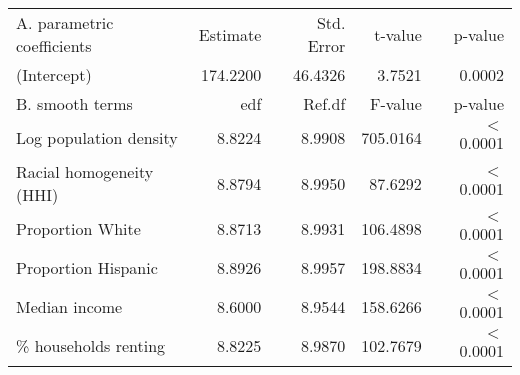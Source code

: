 \begin{table}[ht]
\centering
\begin{tabular}{lrrrr}
   \hline
A. parametric coefficients & Estimate & Std. Error & t-value & p-value \\ 
  (Intercept) & 174.2200 & 46.4326 & 3.7521 & 0.0002 \\ 
   \hline
B. smooth terms & edf & Ref.df & F-value & p-value \\ 
  Log population density & 8.8224 & 8.9908 & 705.0164 & $<$ 0.0001 \\ 
  Racial homogeneity (HHI) & 8.8794 & 8.9950 & 87.6292 & $<$ 0.0001 \\ 
  Proportion White & 8.8713 & 8.9931 & 106.4898 & $<$ 0.0001 \\ 
  Proportion Hispanic & 8.8926 & 8.9957 & 198.8834 & $<$ 0.0001 \\ 
  Median income & 8.6000 & 8.9544 & 158.6266 & $<$ 0.0001 \\ 
  \% households renting & 8.8225 & 8.9870 & 102.7679 & $<$ 0.0001 \\ 
   \hline
\end{tabular}
\caption{ } 
\label{Demographic GAM}
\end{table}
